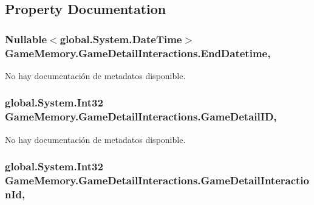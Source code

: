 \subsection{Property Documentation}
\hypertarget{class_game_memory_1_1_game_detail_interactions_a021bedafc27dc63de5952facb05c6127}{
\subsubsection[{End\-Datetime}]{\setlength{\rightskip}{0pt plus 5cm}Nullable$<$global.\-System.\-Date\-Time$>$ Game\-Memory.\-Game\-Detail\-Interactions.\-End\-Datetime\hspace{0.3cm}{\ttfamily [get]}, {\ttfamily [set]}}}\label{class_game_memory_1_1_game_detail_interactions_a021bedafc27dc63de5952facb05c6127}


No hay documentación de metadatos disponible. 

\hypertarget{class_game_memory_1_1_game_detail_interactions_ae1bcee4700f49b55aa0a63ee376d1379}{
\subsubsection[{Game\-Detail\-I\-D}]{\setlength{\rightskip}{0pt plus 5cm}global.\-System.\-Int32 Game\-Memory.\-Game\-Detail\-Interactions.\-Game\-Detail\-I\-D\hspace{0.3cm}{\ttfamily [get]}, {\ttfamily [set]}}}\label{class_game_memory_1_1_game_detail_interactions_ae1bcee4700f49b55aa0a63ee376d1379}


No hay documentación de metadatos disponible. 

\hypertarget{class_game_memory_1_1_game_detail_interactions_a7c85d9badde12a4e6167757744640f52}{
\subsubsection[{Game\-Detail\-Interaction\-Id}]{\setlength{\rightskip}{0pt plus 5cm}global.\-System.\-Int32 Game\-Memory.\-Game\-Detail\-Interactions.\-Game\-Detail\-Interaction\-Id\hspace{0.3cm}{\ttfamily [get]}, {\ttfamily [set]}}}\label{class_game_memory_1_1_game_detail_interactions_a7c85d9badde12a4e6167757744640f52}


